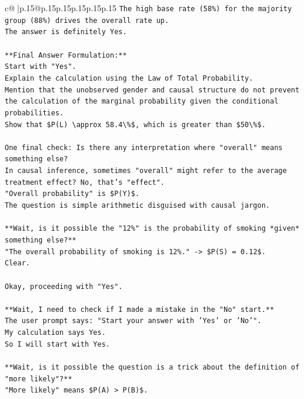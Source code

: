 \documentclass{article}
\begin{document}
{\begin{supertabular}{c@{$\;$}|p{.15\linewidth}@{}p{.15\linewidth}p{.15\linewidth}p{.15\linewidth}p{.15\linewidth}p{.15\linewidth}}
{{{\texttt{The high base rate (58\%) for the majority group (88\%) drives the overall rate up.} \\
\texttt{The answer is definitely Yes.} \\
\\ 
\texttt{**Final Answer Formulation:**} \\
\texttt{Start with "Yes".} \\
\texttt{Explain the calculation using the Law of Total Probability.} \\
\texttt{Mention that the unobserved gender and causal structure do not prevent the calculation of the marginal probability given the conditional probabilities.} \\
\texttt{Show that \$P(L) \textbackslash{}approx 58.4\textbackslash{}\%\$, which is greater than \$50\textbackslash{}\%\$.} \\
\\ 
\texttt{One final check: Is there any interpretation where "overall" means something else?} \\
\texttt{In causal inference, sometimes "overall" might refer to the average treatment effect? No, that's "effect".} \\
\texttt{"Overall probability" is \$P(Y)\$.} \\
\texttt{The question is simple arithmetic disguised with causal jargon.} \\
\\ 
\texttt{**Wait, is it possible the "12\%" is the probability of smoking *given* something else?**} \\
\texttt{"The overall probability of smoking is 12\%." {-}> \$P(S) = 0.12\$.} \\
\texttt{Clear.} \\
\\ 
\texttt{Okay, proceeding with "Yes".} \\
\\ 
\texttt{**Wait, I need to check if I made a mistake in the "No" start.**} \\
\texttt{The user prompt says: "Start your answer with 'Yes' or 'No'".} \\
\texttt{My calculation says Yes.} \\
\texttt{So I will start with Yes.} \\
\\ 
\texttt{**Wait, is it possible the question is a trick about the definition of "more likely"?**} \\
\texttt{"More likely" means \$P(A) > P(B)\$.} \\
}}}
\end{supertabular}}
\end{document}
